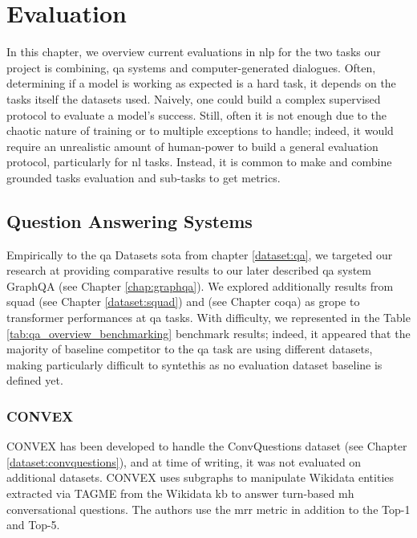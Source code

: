 \chapter{Evaluation}
\label{chap:evaluation}

In this chapter, we overview current evaluations in \gls{nlp} for the two tasks our project is combining, \gls{qa} systems and computer-generated dialogues. Often, determining if a model is working as expected is a hard task, it depends on the tasks itself the datasets used. Naively, one could build a complex supervised protocol to evaluate a model's success. Still, often it is not enough due to the chaotic nature of training or to multiple exceptions to handle; indeed, it would require an unrealistic amount of human-power to build a general evaluation protocol, particularly for \gls{nl} tasks. Instead, it is common to make and combine grounded tasks evaluation and sub-tasks to get metrics.


\section{Question Answering Systems}
Empirically to the \gls{qa} Datasets \gls{sota} from chapter \ref{dataset:qa}, we targeted our research at providing comparative results to our later described \gls{qa} system GraphQA (see Chapter \ref{chap:graphqa}). We explored additionally results from \gls{squad} (see Chapter \ref{dataset:squad}) and (see Chapter \gls{coqa}) as grope to \gls{transformer} performances at \gls{qa} tasks. With difficulty, we represented in the Table \ref{tab:qa_overview_benchmarking} benchmark results; indeed, it appeared that the majority of baseline competitor to the \gls{qa} task are using different datasets, making particularly difficult to syntethis as no evaluation dataset baseline is defined yet.

\subsection{CONVEX}
\label{eval:convex}
CONVEX \autocite{paper:convex} has been developed to handle the ConvQuestions dataset (see Chapter \ref{dataset:convquestions}), and at time of writing, it was not evaluated on additional datasets. CONVEX uses subgraphs to manipulate Wikidata entities extracted via TAGME \autocite{paper:CIKM-2010-FerraginaS} from the Wikidata \gls{kb} to answer turn-based \gls{mh} conversational questions. The authors use the \gls{mrr} metric in addition to the Top-1 and Top-5.

